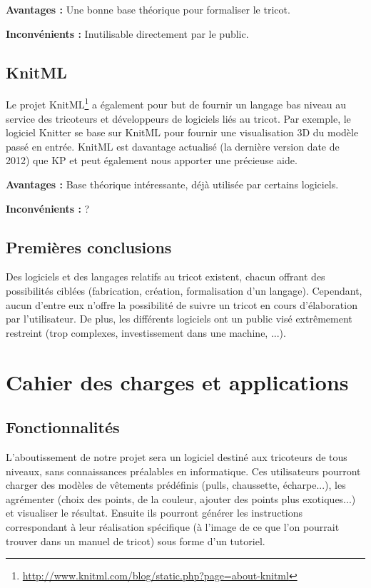 \documentclass{article}
\begin{document}
\textbf{Avantages : } Une bonne base théorique pour formaliser le tricot.

\textbf{Inconvénients : } Inutilisable directement par le public.

\subsection{KnitML}

Le projet KnitML\footnote{\url{http://www.knitml.com/blog/static.php?page=about-knitml}} a également pour but de fournir un langage bas
niveau au service des tricoteurs et développeurs de logiciels liés au tricot. Par exemple, le logiciel Knitter se base sur KnitML pour
fournir une visualisation 3D du modèle passé en entrée. KnitML est davantage actualisé (la dernière version date de 2012) que KP et peut
également nous apporter une précieuse aide.

\textbf{Avantages : } Base théorique intéressante, déjà utilisée par certains logiciels.

\textbf{Inconvénients : } ? %

\subsection{Premières conclusions}

Des logiciels et des langages relatifs au tricot existent, chacun offrant des possibilités ciblées (fabrication, création, formalisation
d'un langage). Cependant, aucun d'entre eux n'offre la possibilité de suivre un tricot en cours d'élaboration par l'utilisateur. De plus,
les différents logiciels ont un public visé extrêmement restreint (trop complexes, investissement dans une machine, ...).

\section{Cahier des charges et applications}

\subsection{Fonctionnalités}

L'aboutissement de notre projet sera un logiciel destiné aux tricoteurs de tous niveaux, sans connaissances préalables en informatique.
Ces utilisateurs pourront charger des modèles de vêtements prédéfinis (pulls, chaussette, écharpe...), les agrémenter (choix des points,
de la couleur, ajouter des points plus exotiques...) et visualiser le résultat. Ensuite ils pourront générer les instructions correspondant à leur réalisation
spécifique (à l'image de ce que l'on pourrait trouver dans un manuel de tricot) sous forme d'un tutoriel.
\end{document}
